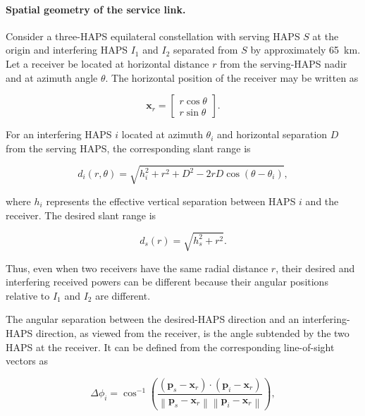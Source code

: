 \documentclass[conference]{IEEEtran}
\begin{document}
\paragraph{Spatial geometry of the service link.}

Consider a three-HAPS equilateral constellation with serving HAPS $S$ at the origin and interfering HAPS $I_1$ and $I_2$ separated from $S$ by approximately 65~km. Let a receiver be located at horizontal distance $r$ from the serving-HAPS nadir and at azimuth angle $\theta$. The horizontal position of the receiver may be written as

\begin{equation}
\mathbf{x}_r
=
\begin{bmatrix}
 r\cos\theta\\
 r\sin\theta
\end{bmatrix}.
\end{equation}

For an interfering HAPS $i$ located at azimuth $\theta_i$ and horizontal separation $D$ from the serving HAPS, the corresponding slant range is

\begin{equation}
d_i(r,\theta)
=
\sqrt{
 h_i^2
 + r^2
 + D^2
 -2rD\cos(\theta-\theta_i)
},
\label{eq:interferer-slant-range}
\end{equation}

where $h_i$ represents the effective vertical separation between HAPS $i$ and the receiver. The desired slant range is

\begin{equation}
d_s(r)
=
\sqrt{h_s^2+r^2}.
\label{eq:desired-slant-range}
\end{equation}

Thus, even when two receivers have the same radial distance $r$, their desired and interfering received powers can be different because their angular positions relative to $I_1$ and $I_2$ are different.

The angular separation between the desired-HAPS direction and an interfering-HAPS direction, as viewed from the receiver, is the angle subtended by the two HAPS at the receiver. It can be defined from the corresponding line-of-sight vectors as

\begin{equation}
\Delta\phi_i
=
\cos^{-1}
\left(
\frac{
(\mathbf{p}_s-\mathbf{x}_r)\cdot(\mathbf{p}_i-\mathbf{x}_r)
}{
\left\|\mathbf{p}_s-\mathbf{x}_r\right\|
\left\|\mathbf{p}_i-\mathbf{x}_r\right\|
}
\right),
\label{eq:angular-subtend}
\end{equation}
\end{document}

